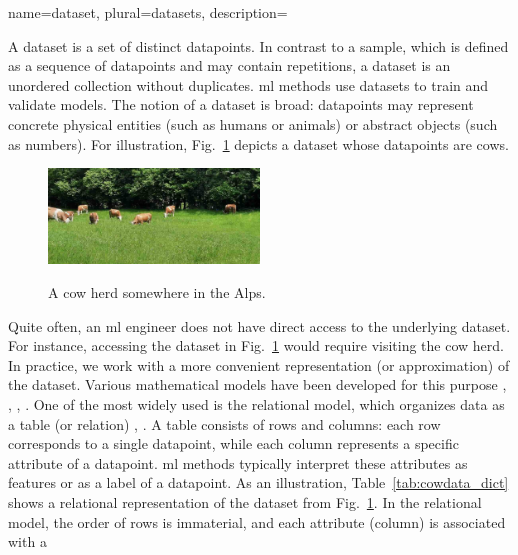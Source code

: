{name={dataset}, plural={datasets},
	description={
	A dataset is a set of distinct \glspl{datapoint}. In contrast to 
	a \gls{sample}, which is defined as a sequence of \glspl{datapoint} and may 
	contain repetitions, a dataset is an unordered collection without duplicates. 
	\gls{ml} methods use datasets to train and validate \glspl{model}. 
	The notion of a dataset is broad: \glspl{datapoint} may represent concrete 
	physical entities (such as humans or animals) or abstract objects (such as numbers). 
	For illustration, Fig.~\ref{fig_cows_dataset_dict} depicts a dataset whose 
	\glspl{datapoint} are cows.	
		\begin{figure}[H]
			\begin{center}
			\label{fig:cowsintheswissalps_dict}
			\includegraphics[width=0.5\textwidth]{assets/CowsAustria.jpg}
		  	\end{center}
			\caption{\label{fig_cows_dataset_dict}A cow herd somewhere in the Alps.}
	 	\end{figure}
		Quite often, an \gls{ml} engineer does not have direct access to the underlying dataset. 
		For instance, accessing the dataset in Fig.~\ref{fig_cows_dataset_dict} would require 
		visiting the cow herd. In practice, we work with a more convenient 
		representation (or approximation) of the dataset. Various mathematical \glspl{model} 
		have been developed for this purpose \cite{silberschatz2019database}, \cite{abiteboul1995foundations}, 
		\cite{hoberman2009data}, \cite{ramakrishnan2002database}. One of the most widely used is 
		the relational \gls{model}, which organizes \gls{data} as a table (or relation) 
		\cite{codd1970relational}, \cite{silberschatz2019database}. A table consists of 
		rows and columns: each row corresponds to a single \gls{datapoint}, while each 
		column represents a specific attribute of a \gls{datapoint}. 
		\gls{ml} methods typically interpret these attributes as \glspl{feature} 
		or as a \gls{label} of a \gls{datapoint}. As an illustration, 
		Table~\ref{tab:cowdata_dict} shows a relational representation of the 
		dataset from Fig.~\ref{fig_cows_dataset_dict}. In the relational \gls{model}, 
		the order of rows is immaterial, and each attribute (column) is associated with a 
}}
